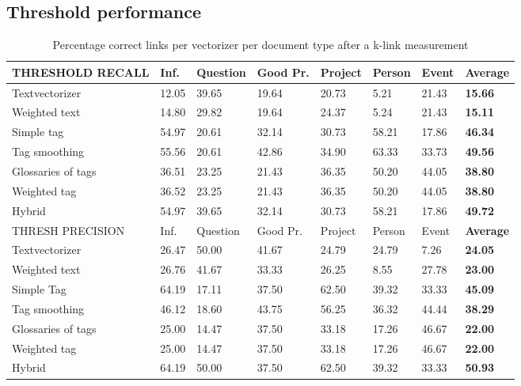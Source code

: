 \subsection{Threshold performance}
\begin{table}
\begin{tabular}{| l | l | l | l | l | l | l | l |}
\hline
THRESHOLD RECALL & Inf. &  Question &  Good Pr.& Project & Person &  Event & {\bf Average} \\
\hline
Textvectorizer & 12.05 & 39.65 & 19.64 & 20.73 & 5.21 & 21.43 & {\bf 15.66}\\
Weighted text & 14.80 & 29.82 & 19.64 & 24.37 & 5.24 & 21.43 & {\bf 15.11}\\
Simple tag & 54.97 & 20.61 & 32.14 & 30.73 & 58.21 & 17.86 & {\bf 46.34}\\
Tag smoothing & 55.56 & 20.61 & 42.86 & 34.90 & 63.33 & 33.73 & {\bf 49.56}\\
Glossaries of tags & 36.51 & 23.25 & 21.43 & 36.35 & 50.20 & 44.05 & {\bf 38.80}\\
Weighted tag & 36.52 & 23.25 & 21.43 & 36.35 & 50.20 & 44.05 & {\bf 38.80}\\
Hybrid & 54.97 & 39.65 & 32.14 & 30.73 & 58.21 & 17.86 & {\bf 49.72}\\
\hline

\hline
THRESH PRECISION & Inf. &  Question &  Good Pr.& Project & Person &  Event & {\bf Average} \\
\hline
Textvectorizer & 26.47 & 50.00 & 41.67 & 24.79 & 24.79 & 7.26 & {\bf 24.05}\\
Weighted text & 26.76 & 41.67 & 33.33 & 26.25 & 8.55 & 27.78 & {\bf 23.00}\\
Simple Tag & 64.19 & 17.11 & 37.50 & 62.50 & 39.32 & 33.33 & {\bf 45.09}\\
Tag smoothing & 46.12 & 18.60 & 43.75 & 56.25 & 36.32 & 44.44 & {\bf 38.29}\\
Glossaries of tags & 25.00 & 14.47 & 37.50 & 33.18 & 17.26 & 46.67 & {\bf 22.00}\\
Weighted tag & 25.00 & 14.47 & 37.50 & 33.18 & 17.26 & 46.67 & {\bf 22.00}\\
Hybrid & 64.19 & 50.00 & 37.50 & 62.50 & 39.32 & 33.33 & {\bf 50.93}\\
\hline
\end{tabular}

\caption{Percentage correct links per vectorizer per document type after a k-link measurement}
\label{bayes_table1}
\end{table}

